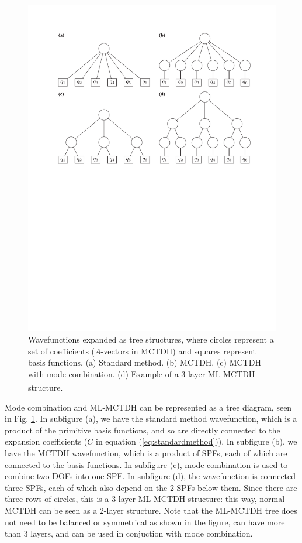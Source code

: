 \documentclass[12pt]{article}
\begin{document}
\begin{figure}[h]
    \centering
    \includegraphics[page=1,width=\textwidth]{img/mcdth_trees.pdf}
    \caption{Wavefunctions expanded as tree structures, where circles represent a set of coefficients (\(A\)-vectors in MCTDH) and squares represent basis functions. (a) Standard method. (b) MCTDH. (c) MCTDH with mode combination. (d) Example of a 3-layer ML-MCTDH structure.\textsuperscript{\cite{studying}}}
    \label{fig:mcdth_trees}
\end{figure}
Mode combination and ML-MCTDH can be represented as a tree diagram, seen in Fig. \ref{fig:mcdth_trees}. In subfigure (a), we have the standard method wavefunction, which is a product of the primitive basis functions, and so are directly connected to the expansion coefficients (\(C\) in equation (\ref{eq:standardmethod})). In subfigure (b), we have the MCTDH wavefunction, which is a product of SPFs, each of which are connected to the basis functions. In subfigure (c), mode combination is used to combine two DOFs into one SPF. In subfigure (d), the wavefunction is connected three SPFs, each of which also depend on the 2 SPFs below them. Since there are three rows of circles, this is a 3-layer ML-MCTDH structure: this way, normal MCTDH can be seen as a 2-layer structure. Note that the ML-MCTDH tree does not need to be balanced or symmetrical as shown in the figure, can have more than 3 layers, and can be used in conjuction with mode combination.
\end{document}
